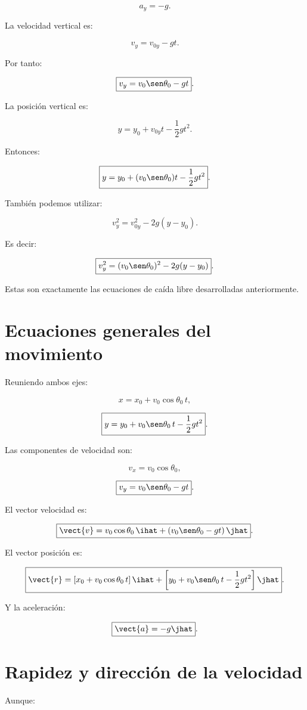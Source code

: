 \[
a_y=-g.
\]

La velocidad vertical es:

\[
v_y=v_{0y}-gt.
\]

Por tanto:

\[
\boxed{
v_y=v_0\sen\theta_0-gt
}.
\]

La posición vertical es:

\[
y=y_0+v_{0y}t-\frac{1}{2}gt^2.
\]

Entonces:

\[
\boxed{
y
=
y_0
+
(v_0\sen\theta_0)t
-
\frac{1}{2}gt^2
}.
\]

También podemos utilizar:

\[
v_y^2
=
v_{0y}^2
-
2g(y-y_0).
\]

Es decir:

\[
\boxed{
v_y^2
=
(v_0\sen\theta_0)^2
-
2g(y-y_0)
}.
\]

Estas son exactamente las ecuaciones de caída libre desarrolladas
anteriormente.


\section{Ecuaciones generales del movimiento}

Reuniendo ambos ejes:

\[
\boxed{
x
=
x_0
+
v_0\cos\theta_0\,t
},
\]

\[
\boxed{
y
=
y_0
+
v_0\sen\theta_0\,t
-
\frac{1}{2}gt^2
}.
\]

Las componentes de velocidad son:

\[
\boxed{
v_x=v_0\cos\theta_0
},
\]

\[
\boxed{
v_y=v_0\sen\theta_0-gt
}.
\]

El vector velocidad es:

\[
\boxed{
\vect{v}
=
v_0\cos\theta_0\,\ihat
+
\left(
v_0\sen\theta_0-gt
\right)\jhat
}.
\]

El vector posición es:

\[
\boxed{
\vect{r}
=
\left[
x_0+v_0\cos\theta_0\,t
\right]\ihat
+
\left[
y_0+v_0\sen\theta_0\,t-\frac{1}{2}gt^2
\right]\jhat
}.
\]

Y la aceleración:

\[
\boxed{
\vect{a}=-g\jhat
}.
\]


\section{Rapidez y dirección de la velocidad}

Aunque:

